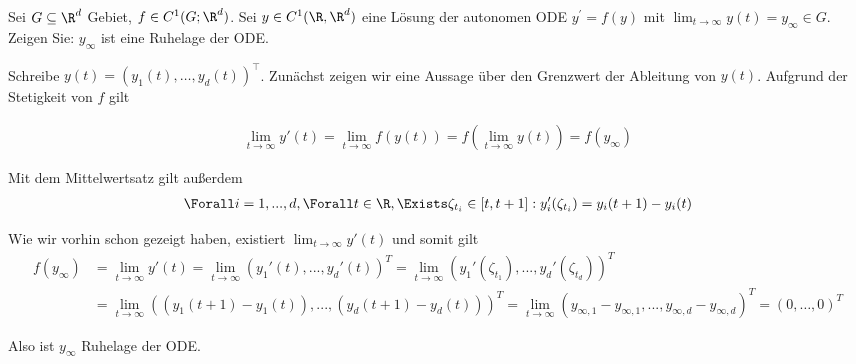 \begin{exercise}
Sei $G \subseteq \R^d$ Gebiet, $f \in C^1(G;\R^d)$. Sei $y \in C^1(\R,\R^d)$
eine Lösung der autonomen ODE $y^{\prime} = f(y)$ mit
$\lim_{t \rightarrow \infty} y(t) = y_{\infty} \in G$.
Zeigen Sie: $y_{\infty}$ ist eine Ruhelage der ODE.
\end{exercise}
\begin{solution}
Schreibe $y(t) = (y_1(t),\dots, y_d(t))^{\top}$.
Zunächst zeigen wir eine Aussage über den Grenzwert der Ableitung von $y(t)$. Aufgrund der Stetigkeit von $f$ gilt

\begin{align*}
  \lim_{t \to \infty} y'(t) = \lim_{t \to \infty} f(y(t)) = f(\lim_{t \to \infty} y(t)) = f(y_{\infty})
\end{align*}

Mit dem Mittelwertsatz gilt außerdem
\begin{align*}
  \Forall i = 1,...,d, \Forall t \in \R, \Exists \zeta_{t_i} \in [t,t+1]: y_i '(\zeta_{t_i}) = y_i(t+1)-y_i(t)
\end{align*}

Wie wir vorhin schon gezeigt haben, existiert $\lim_{t \to \infty} y'(t)$ und somit gilt
\begin{align*}
  f(y_\infty) &= \lim_{t \to \infty} y'(t) = \lim_{t \to \infty} (y_1'(t),...,y_d'(t))^{T}
  = \lim_{t \to \infty} (y_1'(\zeta_{t_1}),...,y_d'(\zeta_{t_d}))^{T}  \\
  &= \lim_{t \to \infty} ((y_1(t+1)-y_1(t)),...,(y_d(t+1)-y_d(t)))^{T}
  = \lim_{t \to \infty} (y_{\infty, 1} - y_{\infty, 1},...,y_{\infty, d} - y_{\infty, d})^{T}
  = (0,\dots,0)^T
\end{align*}

Also ist $y_{\infty}$ Ruhelage der ODE.
\end{solution}

